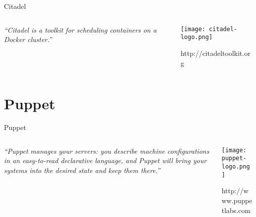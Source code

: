 \documentclass[presentation]{beamer}
\begin{document}
{
\begin{frame}[label=sec-5-2]{Citadel}

\begin{columns}
\begin{column}{0.6\textwidth}

\textit{``Citadel is a toolkit for scheduling containers on a Docker cluster.''}
\end{column}

\begin{column}{0.4\textwidth}
\texttt{[image: citadel-logo.png]}

\small{http://citadeltoolkit.org}
\end{column}
\end{columns}
\end{frame}} %

\section{Puppet}
\label{sec-6}

{
\begin{frame}[label=sec-6-1]{Puppet}

\begin{columns}
\begin{column}{0.6\textwidth}

\textit{``Puppet manages your servers: you describe machine configurations in an easy-to-read declarative language, and Puppet will bring your systems into the desired state and keep them there.''}
\end{column}

\begin{column}{0.4\textwidth}
\texttt{[image: puppet-logo.png]}

\small{http://www.puppetlabs.com}
\end{column}
\end{columns}
\end{frame}} %
\end{document}
